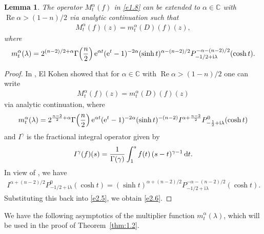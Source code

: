 \documentclass[11pt]{amsproc}
\newcommand{\e}{\mathrm{e}}
\newcommand{\0}{\mathbf{0}}
\newcommand{\CC}{\mathbb{C}}
\renewcommand{\Re}{\mathop{\mathrm{Re}}}
\renewcommand{\i}{\mathrm{i}}
\renewcommand{\d}{\mathrm{d}}
\numberwithin{equation}{section}
\numberwithin{figure}{section}
\newtheorem{lem}[thm]{Lemma}
\theoremstyle{definition}
\theoremstyle{remark}
\numberwithin{thm}{section}
\begin{document}
\begin{lem}\label{lem:2.2}
The operator   $M^\alpha_t(f)$   in  \eqref{e1.8} can be extended to
$\alpha\in\CC$ with $\Re\alpha>(1-n)/2$  via analytic continuation such that
\begin{eqnarray*}
M^\alpha_t(f)(z)=m^\alpha_t(D)(f)(z),
\end{eqnarray*}
where
\begin{eqnarray}\label{e2.6}
m^\alpha_t(\lambda)=2^{(n-2)/2+\alpha}  \Gamma\! \left({n\over 2}\right)
\e^{\alpha t}  (\e^t -1)^{-2\alpha} (\sinh t)^{\alpha-(n-2)/2}P^{-\alpha -(n-2)/2}_{-1/2+\i\lambda}(\cosh t).
\end{eqnarray}
\end{lem}

\begin{proof}
In  \cite[Theorem 1]{Ko}, El Kohen showed that for $\alpha\in\CC$ with $\Re\alpha>(1-n)/2$ one can write
\begin{eqnarray*}
M^\alpha_t(f)(z)=m^\alpha_t(D)(f)(z)
\end{eqnarray*}
via analytic continuation, where
\begin{equation}\label{e2.5}
m^\alpha_t(\lambda)=2^{{n-2\over 2}+\alpha}  \Gamma\! \left({n\over 2}\right)
\e^{\alpha t}  (\e^t -1)^{-2\alpha} (\sinh t)^{-(n-2)}I^{\alpha +{n-2\over 2}}P^0_{-{1\over 2}+\i\lambda}(\cosh t)
\end{equation}
and $I^\gamma$ is the fractional integral operator given by
\begin{eqnarray*}
I^\gamma(f)(s)={1\over\Gamma(\gamma)}\int_1^sf(t)\,(s-t)^{\gamma-1}\,\d t.
\end{eqnarray*}
In view of \cite[(5) on p. 159]{Er}, we have
\begin{eqnarray*}
I^{\alpha+(n-2)/2}P^0_{-1/2+\i\lambda}(\cosh t)=(\sinh t)^{\alpha+(n-2)/2}P^{-\alpha-(n-2)/2}_{-1/2+\i\lambda}(\cosh t).
\end{eqnarray*}
Substituting this back into \eqref{e2.5},   we obtain \eqref{e2.6}.
\end{proof}

We have the following asymptotics of the multiplier function $m^\alpha_t(\lambda)$, which will be used in the proof of Theorem~\ref{thm:1.2}.
\end{document}
